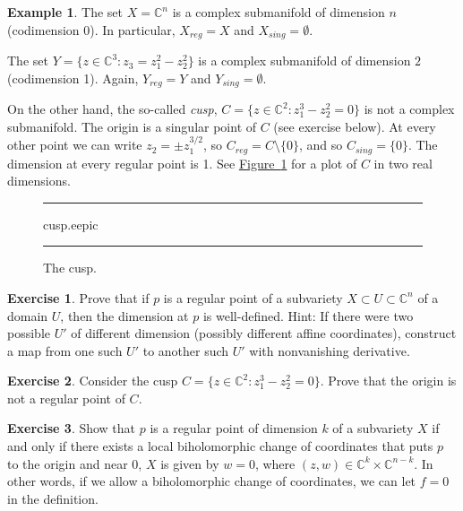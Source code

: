 \documentclass[12pt,openany]{book}
\newcommand{\C}{{\mathbb{C}}}
\newcommand{\myindex}[1]{#1\index{#1}}
\theoremstyle{plain}
\theoremstyle{remark}
\theoremstyle{definition}
\newenvironment{exbox}{%
    \def\FrameCommand{\vrule width 1pt \relax\hspace{10pt}}%
    \MakeFramed{\advance\hsize-\width\FrameRestore}%
}{%
    \endMakeFramed
}
\newenvironment{myfig}{%
\begin{figure}[h!t]
\noindent\rule{\textwidth}{0.5pt}\vspace{12pt}\par\centering}%
{\par\noindent\rule{\textwidth}{0.5pt}
\end{figure}}
\theoremstyle{exercise}
\newtheorem{exercise}{Exercise}[section]
\theoremstyle{example}
\newtheorem{example}[thm]{Example}
\newcommand{\figureref}[1]{\hyperref[#1]{Figure~\ref*{#1}}}
\begin{document}
\begin{example}
The set $X = \C^n$ is a complex submanifold of dimension $n$ (codimension 0).
In particular, $X_{\mathit{reg}} = X$ and $X_{\mathit{sing}} = \emptyset$.

The set $Y = \bigl\{ z \in \C^3 : z_3 = z_1^2 - z_2^2 \bigr\}$ is a complex submanifold of
dimension $2$ (codimension 1).  Again,
$Y_{\mathit{reg}} = Y$ and $Y_{\mathit{sing}} = \emptyset$.

On the other hand, the so-called \emph{\myindex{cusp}},
$C = \bigl\{ z \in \C^2 : z_1^3-z_2^2 = 0 \bigr\}$ is not a complex
submanifold.  The origin is a singular point of $C$
(see exercise below).
At every other point we can write $z_2 = \pm z_1^{3/2}$,
so $C_{\mathit{reg}} = C \setminus \{0\}$, and so $C_{\mathit{sing}} = \{ 0
\}$.
The dimension at every regular point is 1.
See \figureref{fig:cusp} for a
plot of $C$ in two real dimensions.

\begin{myfig}
\medskip
{cusp.eepic}
\bigskip
\caption{The cusp.\label{fig:cusp}}
\end{myfig}
\end{example}


\begin{exbox}
\begin{exercise}
Prove that if $p$ is a regular point of a subvariety $X \subset U \subset
\C^n$ of a domain $U$, then the dimension at $p$ is well-defined.  Hint: If there were two possible
$U'$ of different dimension (possibly different affine coordinates), construct a map
from one such $U'$ to another such $U'$ with nonvanishing derivative.
\end{exercise}

\begin{exercise}
Consider the cusp
$C = \bigl\{ z \in \C^2 : z_1^3-z_2^2 = 0 \bigr\}$.  Prove that
the origin is not a regular point of $C$.
\end{exercise}

\begin{exercise}
Show that $p$ is a regular point of dimension $k$ of a subvariety $X$
if and only if there
exists a local biholomorphic change of coordinates that puts $p$ to the
origin and near $0$, $X$ is given by $w=0$, where $(z,w) \in \C^{k} \times
\C^{n-k}$.  In other words, if we allow a biholomorphic change of
coordinates, we can let $f=0$ in the definition.
\end{exercise}
\end{exbox}
\end{document}
